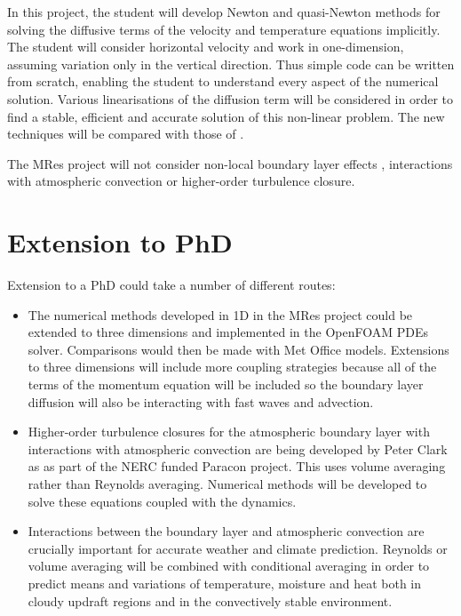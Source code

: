\documentclass[12pt,a4paper]{article}
\begin{document}
In this project, the student will develop Newton and quasi-Newton methods for solving the diffusive terms of the velocity and temperature equations implicitly. The student will consider horizontal velocity and work in one-dimension, assuming variation only in the vertical direction. Thus simple code can be written from scratch, enabling the student to understand every aspect of the numerical solution. Various linearisations of the diffusion term will be considered in order to find a stable, efficient and accurate solution of this non-linear problem. The new techniques will be compared with those of \cite{KK88,DWS06}. 

The MRes project will not consider non-local boundary layer effects  \cite[eg][]{HP96}, interactions with atmospheric convection or higher-order turbulence closure. 

\section*{Extension to PhD}

Extension to a PhD could take a number of different routes:
\begin{itemize}
\item The numerical methods developed in 1D in the MRes project could be extended to three dimensions and implemented in the OpenFOAM PDEs solver. Comparisons would then be made with Met Office models. Extensions to three dimensions will include more coupling strategies because all of the terms of the momentum equation will be included so the boundary layer diffusion will also be interacting with fast waves and advection. 

\item Higher-order turbulence closures for the atmospheric boundary layer with interactions with atmospheric convection are being developed by Peter Clark as as part of the NERC funded Paracon project. This uses volume averaging rather than Reynolds averaging. Numerical methods will be developed to solve these equations coupled with the dynamics. 

\item Interactions between the boundary layer and atmospheric convection are crucially important for accurate weather and climate prediction. Reynolds or volume averaging will be combined with conditional averaging \cite[]{SST07,TWW+1x} in order to predict means and variations of temperature, moisture and heat both in cloudy updraft regions and in the convectively stable environment.
\end{itemize}




\end{document}

